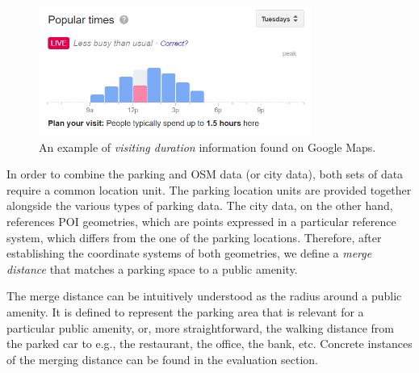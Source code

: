 \documentclass{ws-ijait}
\newcommand{\cmmnt}[1]{\ignorespaces}
\begin{document}
	\begin{figure}[!ht]
		\centering
		\includegraphics[width=0.8\textwidth]{graphics/google_visit_duration.png}
		\caption{An example of \textit{visiting duration} information found on Google Maps.}
		\label{fig:visit_duration}
	\end{figure}  
	
	In order to combine the parking and OSM data (or city data), both sets of data require a common location unit. The parking location units are provided together alongside the various types of parking data. The city data, on the other hand, references POI geometries, which are points expressed in a particular reference system, which differs from the one of the parking locations. Therefore, after establishing the coordinate systems of both geometries, we define a \textit{merge distance} that matches a parking space to a public amenity. 
	
	The merge distance can be intuitively understood as the radius around a public amenity. It is defined to represent the parking area that is relevant for a particular public amenity, or, more straightforward, the walking distance from the parked car to e.g., the restaurant, the office, the bank, etc. Concrete instances of the merging distance can be found in \cmmnt{\cref{experimental_setup:merging_parking_city_data}} the evaluation section.
	
\end{document}
